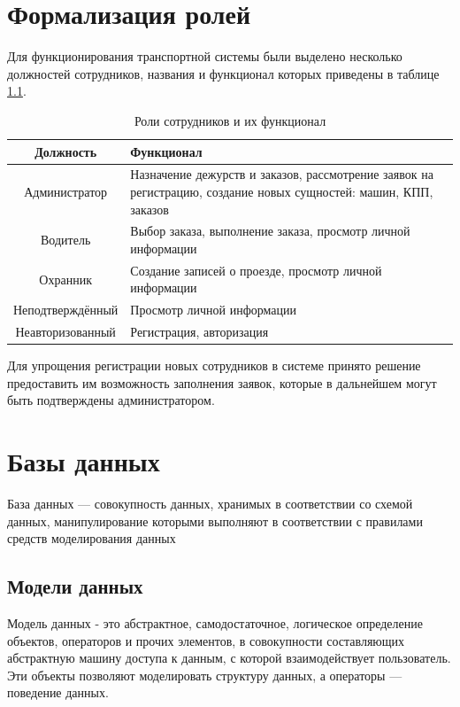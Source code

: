 \section{Формализация ролей}
Для функционирования транспортной системы были выделено несколько должностей сотрудников, названия и функционал которых приведены в таблице \hyperref[role_table]{1.1}.

\begin{table}[h] \label{role_table}
	\caption{Роли сотрудников и их функционал}
	\begin{tabular}{| c | p{11cm} |}
		\hline
		\textbf{Должность}		&	\textbf{Функционал} \\
		\hline
		Администратор			&	
		Назначение дежурств и заказов, рассмотрение заявок на регистрацию, создание новых сущностей: машин, КПП, заказов  \\
		\hline
		
		Водитель &
		Выбор заказа, выполнение заказа, просмотр личной информации \\
		\hline
		
		Охранник &
		Создание записей о проезде, просмотр личной информации  \\
		\hline
		
		Неподтверждённый &
		Просмотр личной информации  \\	
		\hline	
		
		Неавторизованный &
		Регистрация, авторизация  \\		
		\hline
	\end{tabular}
\end{table}

Для упрощения регистрации новых сотрудников в системе принято решение предоставить им возможность заполнения заявок, которые в дальнейшем могут быть подтверждены администратором.

\section{Базы данных}
База данных — совокупность данных, хранимых в соответствии со схемой данных, манипулирование которыми выполняют в соответствии с правилами средств моделирования данных \cite{db_model}

\subsection{Модели данных}
Модель данных - это абстрактное, самодостаточное, логическое определение объектов, операторов и прочих элементов, в совокупности составляющих абстрактную машину доступа к данным, с которой взаимодействует пользователь. Эти объекты позволяют моделировать
структуру данных, а операторы — поведение данных.
\cite{db_model}

